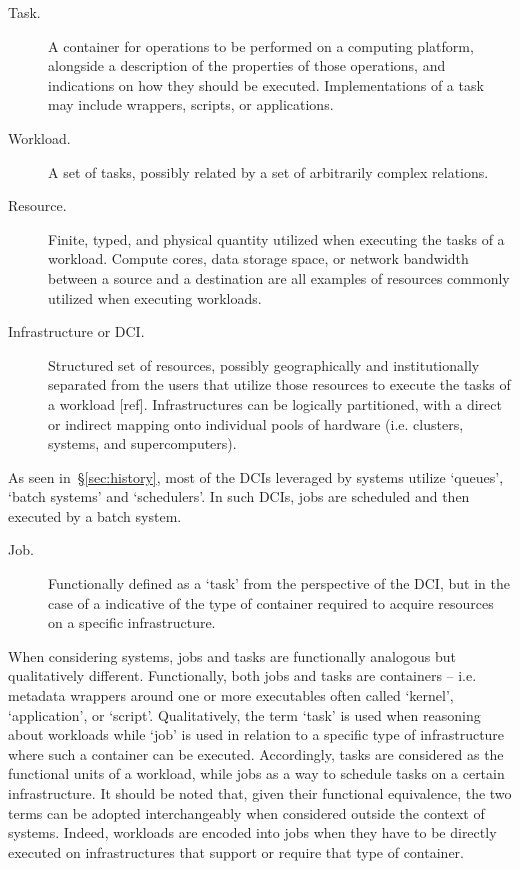 \documentclass{sig-alternate}
\begin{document}
\begin{description}

\item[Task.] A container for operations to be performed on a computing
platform, alongside a description of the properties of those operations, and
indications on how they should be executed. Implementations of a task may
include wrappers, scripts, or applications.

\item[Workload.] A set of tasks, possibly related by a set of arbitrarily
complex relations.

\item[Resource.] Finite, typed, and physical quantity utilized when executing
the tasks of a workload. Compute cores, data storage space, or network
bandwidth between a source and a destination are all examples of resources
commonly utilized when executing workloads.

\item[Infrastructure or DCI.] Structured set of resources, possibly
geographically and institutionally separated from the users that utilize those
resources to execute the tasks of a workload [ref]. Infrastructures can be
logically partitioned, with a direct or indirect mapping onto individual pools
of hardware (i.e. clusters, systems, and supercomputers).

\end{description}

As seen in~\S\ref{sec:history}, most of the DCIs leveraged by \pilot systems
utilize `queues', `batch systems' and `schedulers'. In such DCIs, jobs are
scheduled and then executed by a batch system.

\begin{description}

\item[Job.] Functionally defined as a `task' from the perspective of the DCI,
but in the case of a \pilot indicative of the type of container required to
acquire resources on a specific infrastructure.

\end{description}

When considering \pilot systems, jobs and tasks are functionally analogous but
qualitatively different. Functionally, both jobs and tasks are containers --
i.e. metadata wrappers around one or more executables often called `kernel',
`application', or `script'. Qualitatively, the term `task' is used when
reasoning about workloads while `job' is used in relation to a specific type of
infrastructure where such a container can be executed. Accordingly, tasks are
considered as the functional units of a workload, while jobs as a way to
schedule tasks on a certain infrastructure. It should be noted that, given
their functional equivalence, the two terms can be adopted interchangeably when
considered outside the context of \pilot systems. Indeed, workloads are encoded
into jobs when they have to be directly executed on infrastructures that
support or require that type of container.
\end{document}
